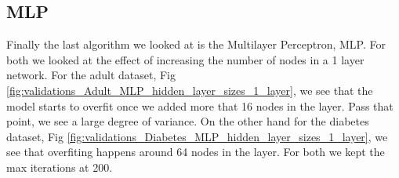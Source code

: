 \documentclass[11pt, twocolumn]{article}
\begin{document}
    \subsection{MLP}

    Finally the last algorithm we looked at is the Multilayer Perceptron, MLP. For both we looked at the effect of increasing the number of nodes in a 1 layer network. For the adult dataset, Fig \ref{fig:validations_Adult_MLP_hidden_layer_sizes_1_layer}, we see that the model starts to overfit once we added more that 16 nodes in the layer. Pass that point, we see a large degree of variance. On the other hand for the diabetes dataset, Fig \ref{fig:validations_Diabetes_MLP_hidden_layer_sizes_1_layer}, we see that overfiting happens around 64 nodes in the layer. For both we kept the max iterations at 200.
\end{document}
